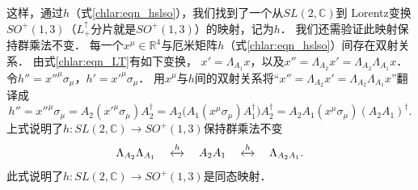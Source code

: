 这样，通过$h$（式\eqref{chlar:eqn_hslso}），我们找到了一个从$SL(2,\mathbb{C})$到
Lorentz变换$SO^{+}(1,3)$（$L^{\uparrow}_{+}$分片就是$SO^{+}(1,3)$）的映射，记为$h$．
我们还需验证此映射保持群乘法不变．
每一个$x^\mu \in \mathbb{R}^4$与厄米矩阵$h$（式\eqref{chlar:eqn_hslso}）间存在双射关系．
由式\eqref{chlar:eqn_LT}有如下变换，
$x'=\Lambda_{A_1} x$，以及$x''=\Lambda_{A_2} x'=\Lambda_{A_2} \Lambda_{A_1}x$．
令$h''=x''^\mu \sigma_\mu$，$h'=x'^\mu \sigma_\mu$．
用$x^\mu $与$h$间的双射关系将“$x''=\Lambda_{A_2} x'=\Lambda_{A_2} \Lambda_{A_1}x$”翻译成
\begin{equation*}
    h''=x''^\mu \sigma_\mu=A_2 (x'^\mu \sigma_\mu) A_2^\dagger
    =A_2 \bigl( A_1(x^\mu \sigma_\mu)A_1^\dagger \bigr) A_2^\dagger
    = A_2 A_1 (x^\mu \sigma_\mu) (A_2A_1)^\dagger .
\end{equation*}
上式说明了$h:SL(2,\mathbb{C})\to SO^{+}(1,3)$保持群乘法不变
\begin{equation}
    \Lambda_{A_2}\Lambda_{A_1} \quad \xleftrightarrow{h} \quad  A_2 A_1
     \quad \xleftrightarrow{h}\quad \Lambda_{A_2 A_1}.
\end{equation}
此式说明了$h:SL(2,\mathbb{C})\to SO^{+}(1,3)$是同态映射．

